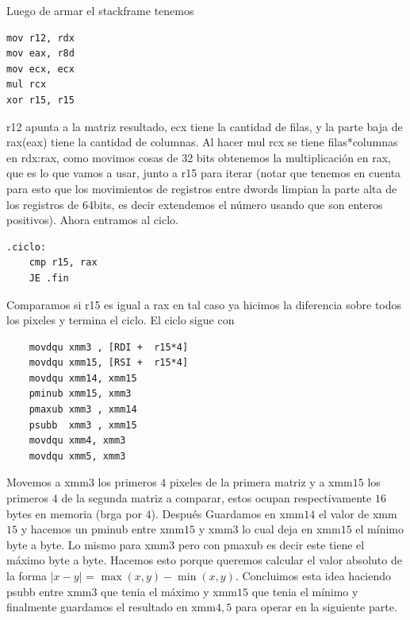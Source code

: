 \documentclass[a4paper]{article}
\begin{document}
 Luego de armar el stackframe tenemos
\begin{codesnippet}
\begin{verbatim}
mov r12, rdx
mov eax, r8d
mov ecx, ecx
mul rcx
xor r15, r15
\end{verbatim}
\end{codesnippet}
r12 apunta a la matriz resultado, ecx tiene la cantidad de filas, y la parte baja de rax(eax) tiene la cantidad de columnas. Al hacer mul rcx se tiene filas*columnas en rdx:rax, como movimos cosas de 32 bits obtenemos la multiplicación en rax, que es lo que vamos a usar, junto a r15 para iterar (notar que tenemos en cuenta para esto que los movimientos de registros entre dwords limpian la parte alta de los registros de 64bits, es decir extendemos el número usando que son enteros positivos). Ahora entramos al ciclo.

\begin{codesnippet}
\begin{verbatim}
.ciclo:
    cmp r15, rax
    JE .fin
\end{verbatim}
\end{codesnippet}

 Comparamos si r15 es igual a rax en tal caso ya hicimos la diferencia sobre todos los pixeles y termina el ciclo. El ciclo sigue con

\begin{codesnippet}
\begin{verbatim}
    movdqu xmm3 , [RDI +  r15*4]   
    movdqu xmm15, [RSI +  r15*4]
    movdqu xmm14, xmm15     
    pminub xmm15, xmm3        
    pmaxub xmm3 , xmm14        
    psubb  xmm3 , xmm15             
    movdqu xmm4, xmm3 
    movdqu xmm5, xmm3       
\end{verbatim}
\end{codesnippet}

 Movemos a xmm$3$ los primeros $4$ pixeles de la primera matriz y a xmm$15$ los primeros $4$ de la segunda matriz a comparar, estos ocupan respectivamente $16$ bytes en memoria (brga por $4$). Después Guardamos en xmm$14$ el valor de xmm$15$ y hacemos un pminub entre xmm$15$ y xmm$3$ lo cual deja en xmm$15$ el mínimo byte a byte. Lo mismo para xmm$3$ pero con pmaxub es decir este tiene el máximo byte a byte. Hacemos esto porque queremos calcular el valor absoluto de la forma $|x-y|$ = $\max(x,y) - \min(x,y)$. Concluimos esta idea haciendo psubb entre xmm$3$ que tenia el máximo y xmm$15$ que tenia el mínimo y finalmente guardamos el resultado en xmm$4,5$ para operar en la siguiente parte.
\end{document}
